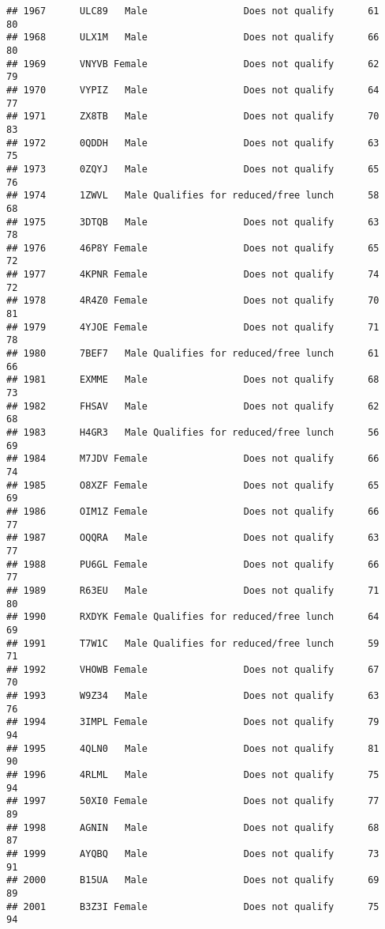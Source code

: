\documentclass[
]{article}
\begin{document}
\begin{verbatim}
## 1967      ULC89   Male                 Does not qualify      61       80
## 1968      ULX1M   Male                 Does not qualify      66       80
## 1969      VNYVB Female                 Does not qualify      62       79
## 1970      VYPIZ   Male                 Does not qualify      64       77
## 1971      ZX8TB   Male                 Does not qualify      70       83
## 1972      0QDDH   Male                 Does not qualify      63       75
## 1973      0ZQYJ   Male                 Does not qualify      65       76
## 1974      1ZWVL   Male Qualifies for reduced/free lunch      58       68
## 1975      3DTQB   Male                 Does not qualify      63       78
## 1976      46P8Y Female                 Does not qualify      65       72
## 1977      4KPNR Female                 Does not qualify      74       72
## 1978      4R4Z0 Female                 Does not qualify      70       81
## 1979      4YJOE Female                 Does not qualify      71       78
## 1980      7BEF7   Male Qualifies for reduced/free lunch      61       66
## 1981      EXMME   Male                 Does not qualify      68       73
## 1982      FHSAV   Male                 Does not qualify      62       68
## 1983      H4GR3   Male Qualifies for reduced/free lunch      56       69
## 1984      M7JDV Female                 Does not qualify      66       74
## 1985      O8XZF Female                 Does not qualify      65       69
## 1986      OIM1Z Female                 Does not qualify      66       77
## 1987      OQQRA   Male                 Does not qualify      63       77
## 1988      PU6GL Female                 Does not qualify      66       77
## 1989      R63EU   Male                 Does not qualify      71       80
## 1990      RXDYK Female Qualifies for reduced/free lunch      64       69
## 1991      T7W1C   Male Qualifies for reduced/free lunch      59       71
## 1992      VHOWB Female                 Does not qualify      67       70
## 1993      W9Z34   Male                 Does not qualify      63       76
## 1994      3IMPL Female                 Does not qualify      79       94
## 1995      4QLN0   Male                 Does not qualify      81       90
## 1996      4RLML   Male                 Does not qualify      75       94
## 1997      50XI0 Female                 Does not qualify      77       89
## 1998      AGNIN   Male                 Does not qualify      68       87
## 1999      AYQBQ   Male                 Does not qualify      73       91
## 2000      B15UA   Male                 Does not qualify      69       89
## 2001      B3Z3I Female                 Does not qualify      75       94

\end{verbatim}
\end{document}
